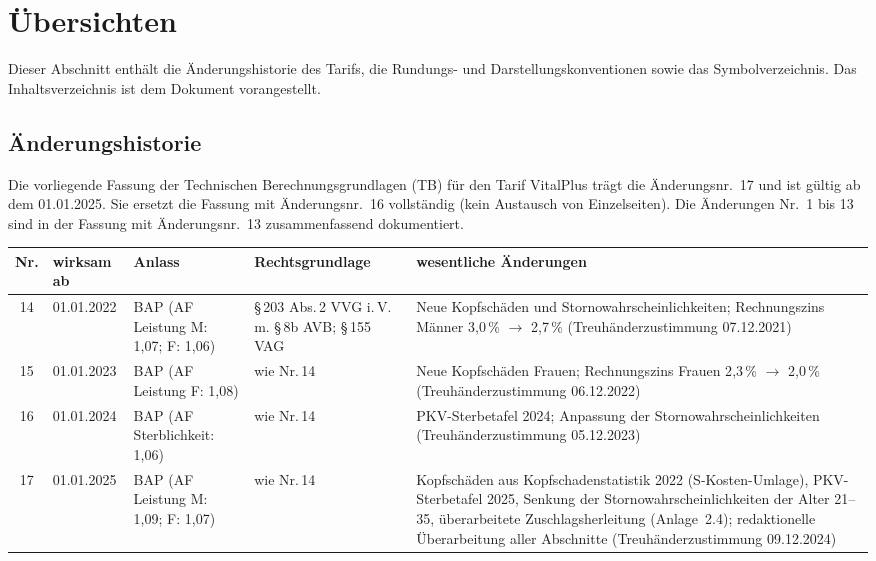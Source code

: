 \section{Übersichten}\label{sec:uebersichten}

Dieser Abschnitt enthält die Änderungshistorie des Tarifs, die
Rundungs- und Darstellungskonventionen sowie das Symbolverzeichnis.
Das Inhaltsverzeichnis ist dem Dokument vorangestellt.

\subsection{Änderungshistorie}\label{sec:historie}

Die vorliegende Fassung der Technischen Berechnungsgrundlagen (TB) für
den Tarif VitalPlus trägt die Änderungsnr.~17 und ist gültig ab dem
01.01.2025. Sie ersetzt die Fassung mit Änderungsnr.~16 vollständig
(kein Austausch von Einzelseiten). Die Änderungen Nr.~1 bis 13 sind in
der Fassung mit Änderungsnr.~13 zusammenfassend dokumentiert.

\begin{center}\footnotesize
\begin{tabular}{@{}cp{1.7cm}p{3.2cm}p{3.6cm}p{5.6cm}@{}}
\toprule
Nr. & wirksam ab & Anlass & Rechtsgrundlage & wesentliche Änderungen \\
\midrule
14 & 01.01.2022 & BAP (AF Leistung M: 1{,}07; F: 1{,}06) & \S\,203 Abs.\,2 VVG i.\,V.\,m. \S\,8b AVB; \S\,155 VAG & Neue Kopfschäden und Stornowahrscheinlichkeiten; Rechnungszins Männer 3{,}0\,\% $\to$ 2{,}7\,\% (Treuhänderzustimmung 07.12.2021) \\
15 & 01.01.2023 & BAP (AF Leistung F: 1{,}08) & wie Nr.\,14 & Neue Kopfschäden Frauen; Rechnungszins Frauen 2{,}3\,\% $\to$ 2{,}0\,\% (Treuhänderzustimmung 06.12.2022) \\
16 & 01.01.2024 & BAP (AF Sterblichkeit: 1{,}06) & wie Nr.\,14 & PKV-Sterbetafel 2024; Anpassung der Stornowahrscheinlichkeiten (Treuhänderzustimmung 05.12.2023) \\
17 & 01.01.2025 & BAP (AF Leistung M: 1{,}09; F: 1{,}07) & wie Nr.\,14 & Kopfschäden aus Kopfschadenstatistik 2022 (S-Kosten-Umlage), PKV-Sterbetafel 2025, Senkung der Stornowahrscheinlichkeiten der Alter 21--35, überarbeitete Zuschlagsherleitung (Anlage~2.4); redaktionelle Überarbeitung aller Abschnitte (Treuhänderzustimmung 09.12.2024) \\
\bottomrule
\end{tabular}
\end{center}

